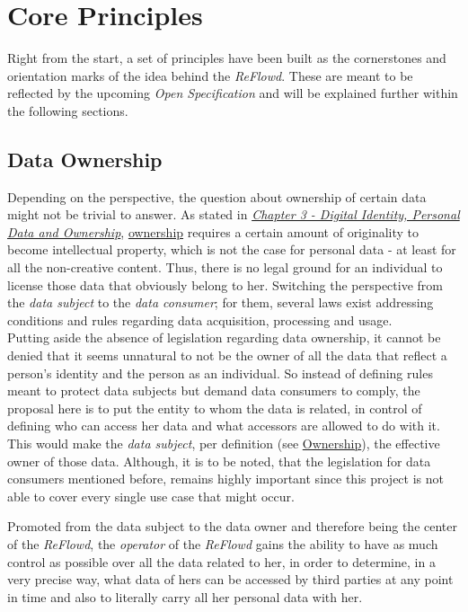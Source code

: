 \documentclass[12pt,english,a4paper,titlepage,cleardoublepage=empty,dottedtoc]{report}
\begin{document}
\hypertarget{core-principles}{\chapter{Core
Principles}\label{core-principles}}

Right from the start, a set of principles have been built as the
cornerstones and orientation marks of the idea behind the
\emph{ReFlowd}. These are meant to be reflected by the upcoming
\emph{Open Specification} and will be explained further within the
following sections.

\section{Data Ownership}\label{data-ownership}

Depending on the perspective, the question about ownership of certain
data might not be trivial to answer. As stated in
\emph{\protect\hyperlink{digital-identity-personal-data-and-ownership}{Chapter
3 - Digital Identity, Personal Data and Ownership}},
\protect\hyperlink{def--ownership}{ownership} requires a certain amount
of originality to become intellectual property, which is not the case
for personal data - at least for all the non-creative content. Thus,
there is no legal ground for an individual to license those data that
obviously belong to her. Switching the perspective from the \emph{data
subject} to the \emph{data consumer}; for them, several laws exist
addressing conditions and rules regarding data acquisition, processing
and usage.\\
Putting aside the absence of legislation regarding data ownership, it
cannot be denied that it seems unnatural to not be the owner of all the
data that reflect a person's identity and the person as an individual.
So instead of defining rules meant to protect data subjects but demand
data consumers to comply, the proposal here is to put the entity to whom
the data is related, in control of defining who can access her data and
what accessors are allowed to do with it. This would make the \emph{data
subject}, per definition (see
\protect\hyperlink{def-ownership}{Ownership}), the effective owner of
those data. Although, it is to be noted, that the legislation for data
consumers mentioned before, remains highly important since this project
is not able to cover every single use case that might occur.

Promoted from the data subject to the data owner and therefore being the
center of the \emph{ReFlowd}, the \emph{operator} of the \emph{ReFlowd}
gains the ability to have as much control as possible over all the data
related to her, in order to determine, in a very precise way, what data
of hers can be accessed by third parties at any point in time and also
to literally carry all her personal data with her.
\end{document}
